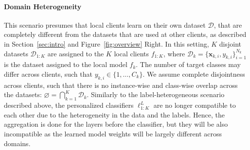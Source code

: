 \vspace{-0.125in}
\paragraph{Domain Heterogeneity} This scenario presumes that local clients learn on their own dataset $\mathcal{D}$, that are completely different from the datasets that are used at other clients, as described in Section~\ref{sec:intro} and Figure~\ref{fig:overview} Right. In this setting, $K$ disjoint datasets $\mathcal{D}_{1:K}$ are assigned to the $K$ local clients $f_{1:K}$, where $\mathcal{D}_k=\{\textbf{x}_{k,i}, y_{k,i}\}^{N_k}_{i=1}$ is the dataset assigned to the local model $f_k$. The number of target classes may differ across clients, such that $y_{k,i} \in \{1,\dots,C_k\}$. We assume complete disjointness across clients, such that there is no instance-wise and class-wise overlap across the datasets: $\varnothing =\bigcap_{k=1}^K \mathcal{D}_k$. Similarly to the label-heterogeneous scenario described above, the personalized classifiers $\ell_{1:K}^{L}$ are no longer compatible to each other due to the heterogeneity in the data and the labels. Hence, the aggregation is done for the layers before the classifier, but they will be also incompatible as the learned model weights will be largely different across domains.


